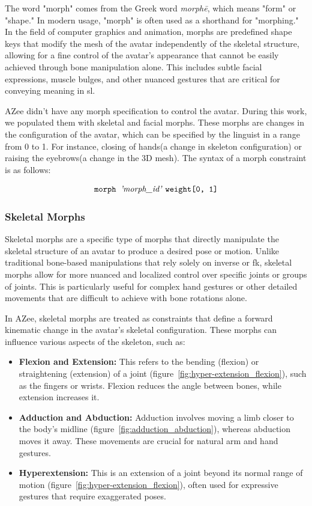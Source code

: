 \documentclass[../../main.tex]{subfiles}
\begin{document}
The word "morph" comes from the Greek word \textit{morphē}, which means "form" or "shape." In modern usage, "morph" is often used as a shorthand for "morphing." In the field of computer graphics and animation, morphs are predefined shape keys that modify the mesh of the avatar independently of the skeletal structure, allowing for a fine control of the avatar's appearance that cannot be easily achieved through bone manipulation alone. This includes subtle facial expressions, muscle bulges, and other nuanced gestures that are critical for conveying meaning in \gls{sl}.

AZee didn't have any morph specification to control the avatar. During this work, we populated them with skeletal and facial morphs. These morphs are changes in the configuration of the avatar, which can be specified by the linguist in a range from 0 to 1. For instance, closing of hands(a change in skeleton configuration) or raising the eyebrows(a change in the 3D mesh). The syntax of a morph constraint is as follows:

\[
\texttt{morph } \text{\emph{'morph\_id'}} \ \texttt{weight[0, 1]}
\]

\subsubsection{Skeletal Morphs}
\label{ch:avatar_creation_pose_synthesis:proc_rig_signing_avatars:morph_constraints:skel_morphs}

Skeletal morphs are a specific type of morphs that directly manipulate the skeletal structure of an avatar to produce a desired pose or motion. Unlike traditional bone-based manipulations that rely solely on inverse or \gls{fk}, skeletal morphs allow for more nuanced and localized control over specific joints or groups of joints. This is particularly useful for complex hand gestures or other detailed movements that are difficult to achieve with bone rotations alone.

In AZee, skeletal morphs are treated as constraints that define a forward kinematic change in the avatar's skeletal configuration. These morphs can influence various aspects of the skeleton, such as:

\begin{itemize}
    \item \textbf{Flexion and Extension:} This refers to the bending (flexion) or straightening (extension) of a joint (figure~\ref{fig:hyper-extension_flexion}), such as the fingers or wrists. Flexion reduces the angle between bones, while extension increases it.
    \item \textbf{Adduction and Abduction:} Adduction involves moving a limb closer to the body's midline (figure~\ref{fig:adduction_abduction}), whereas abduction moves it away. These movements are crucial for natural arm and hand gestures.
    \item \textbf{Hyperextension:} This is an extension of a joint beyond its normal range of motion (figure~\ref{fig:hyper-extension_flexion}), often used for expressive gestures that require exaggerated poses.
\end{itemize}
\end{document}
